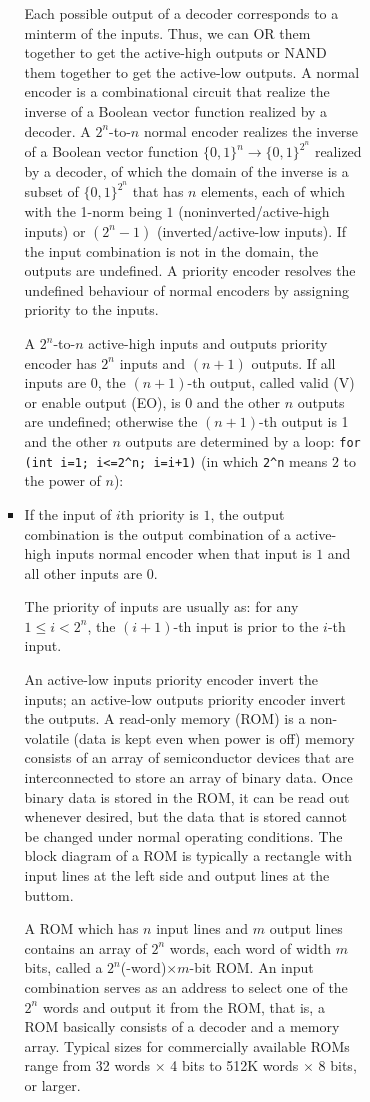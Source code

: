 \documentclass[a4paper,12pt]{article}
\begin{document}
\begin{itemize}
\begin{itemize}
\begin{itemize}
\begin{itemize}
\begin{itemize}
\begin{itemize}
\begin{itemize}
Each possible output of a decoder corresponds to a minterm of the inputs. Thus, we can OR them together to get the active-high outputs or NAND them together to get the active-low outputs.
A normal encoder is a combinational circuit that realize the inverse of a Boolean vector function realized by a decoder. A $2^n$-to-$n$ normal encoder realizes the inverse of a Boolean vector function $\{0,1\}^n\to\{0,1\}^{2^n}$ realized by a decoder, of which the domain of the inverse is a subset of $\{0,1\}^{2^n}$ that has $n$ elements, each of which with the 1-norm being $1$ (noninverted/active-high inputs) or $(2^n-1)$ (inverted/active-low inputs). If the input combination is not in the domain, the outputs are undefined.
A priority encoder resolves the undefined behaviour of normal encoders by assigning priority to the inputs.

A $2^n$-to-$n$ active-high inputs and outputs priority encoder has $2^n$ inputs and $(n+1)$ outputs. If all inputs are 0, the $(n+1)$-th output, called valid (V) or enable output (EO), is 0 and the other $n$ outputs are undefined; otherwise the $(n+1)$-th output is 1 and the other $n$ outputs are determined by a loop: \texttt{for (int i=1; i<=2^n; i=i+1)} (in which \verb|2^n| means $2$ to the power of $n$):
\bit
\item If the input of $i$th priority is $1$, the output combination is the output combination of a active-high inputs normal encoder when that input is $1$ and all other inputs are $0$.
\eit

The priority of inputs are usually as: for any $1\leq i<2^n$, the $(i+1)$-th input is prior to the $i$-th input.

An active-low inputs priority encoder invert the inputs; an active-low outputs priority encoder invert the outputs.
A read-only memory (ROM) is a non-volatile (data is kept even when power is off) memory consists of an array of semiconductor devices that are interconnected to store an array of binary data. Once binary data is stored in the ROM, it can be read out whenever desired, but the data that is stored cannot be changed under normal operating conditions. The block diagram of a ROM is typically a rectangle with input lines at the left side and output lines at the buttom.

A ROM which has $n$ input lines and $m$ output lines contains an array of $2^n$ words, each word of width $m$ bits, called a $2^n$(-word)$\times m$-bit ROM. An input combination serves as an address to select one of the $2^n$ words and output it from the ROM, that is, a ROM basically consists of a decoder and a memory array. Typical sizes for commercially available ROMs range from 32 words $\times$ 4 bits to 512K words $\times$ 8 bits, or larger.


\end{itemize}
\end{itemize}
\end{itemize}
\end{itemize}
\end{itemize}
\end{itemize}
\end{itemize}
\end{document}

